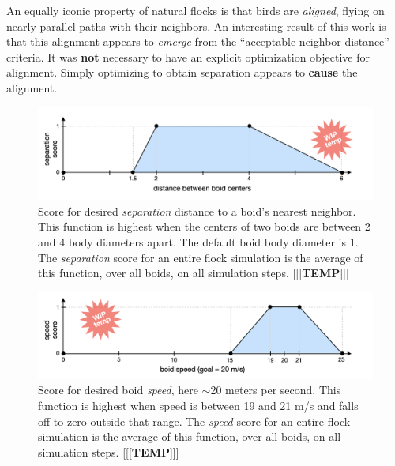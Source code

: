 \documentclass[letterpaper]{article}
\begin{document}
An equally iconic property of natural flocks is that birds are \textit{aligned}, flying on nearly parallel paths with their neighbors. An interesting result of this work is that this alignment appears to \textit{emerge} from the ``acceptable neighbor distance'' criteria. It was \textbf{not} necessary to have an explicit optimization objective for alignment. Simply optimizing to obtain separation appears to \textbf{cause} the alignment.


\begin{figure}[t]
    \centering
    \includegraphics[width=0.9\linewidth]{images/temp_sep_score.png}
    \caption{Score for desired \textit{separation} distance to a boid's nearest neighbor. This function is highest when the centers of two boids are between 2 and 4 body diameters apart. The default boid body diameter is 1. The \textit{separation} score for an entire flock simulation is the average of this function, over all boids, on all simulation steps. [[[\textbf{TEMP}]]]}
    \label{fig:SeparationScore}
\end{figure}


\begin{figure}[t]
    \centering
    \includegraphics[width=0.9\linewidth]{images/temp_speed_score.png}
    \caption{Score for desired boid \textit{speed}, here $\sim$20 meters per second. This function is highest when speed is between 19 and 21 m/s and falls off to zero outside that range. The \textit{speed} score for an entire flock simulation is the average of this function, over all boids, on all simulation steps. [[[\textbf{TEMP}]]]}
    \label{fig:speed_score}
\end{figure}
\end{document}
